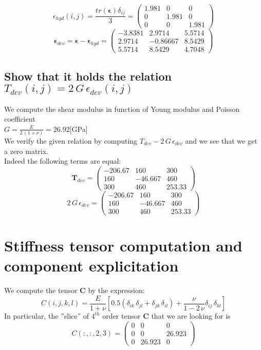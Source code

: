 \documentclass[a4paper,11pt]{article}
\begin{document}
\[  \epsilon_{hyd}(i,j)=  \frac{tr(\mathbf{\epsilon}) \delta_{ij}}{3}= \begin{pmatrix}
         1.981      &      0      &      0\\
            0     &   1.981       &     0\\
            0       &     0    &    1.981 \end{pmatrix}  \]
\[ \mathbf{\epsilon}_{dev}=\mathbf{\epsilon}-\mathbf{\epsilon}_{hyd} = \begin{pmatrix}
       -3.8381   &    2.9714   &    5.5714\\
       2.9714   &  -0.86667   &    8.5429\\
       5.5714   &    8.5429   &    4.7048  \end{pmatrix}  \]

\subsection{Show that it holds the relation $T_{dev}(i,j)=2 \, G \, \epsilon_{dev}(i,j)$ }
We compute the shear modulus in function of Young modulus and Poisson coefficient\\ $G=\frac{E}{2\,(1+\nu)}=26.92$[GPa]\\
We verify the given relation by computing $T_{dev}-2 \, G \, \epsilon_{dev}$ and we see that we get a zero matrix.\\
Indeed the following terms are equal:
\[ \mathbf{T}_{dev}= \begin{pmatrix}
      -206.67    &      160      &    300\\
          160    &  -46.667    &      460\\
          300     &     460  &     253.33 \end{pmatrix}  \]
\[ 2 \, G \, \epsilon_{dev} = \begin{pmatrix}
      -206.67    &      160  &        300\\
          160      &-46.667    &      460\\
          300       &   460      &  253.33 \end{pmatrix}  \]
 
\section{Stiffness tensor computation and component explicitation}
We compute the tensor $\mathbf{C}$ by the expression:
\[ C(i,j,k,l)=\frac{E}{1+\nu}[0.5(\delta_{ik} \, \delta_{jl}+\delta_{jk} \, \delta_{il})+
\frac{\nu}{1-2\, \nu}\delta_{ij} \, \delta_{kl}]  \]
In particular, the ''slice'' of $4^{th}$ order tensor \textbf{C} that we are looking for is 
\[ C(:,:,2,3) = \begin{pmatrix}
            0     &       0     &       0\\
            0      &      0      & 26.923\\
            0      & 26.923     &       0 \end{pmatrix} \]
            
\end{document}
